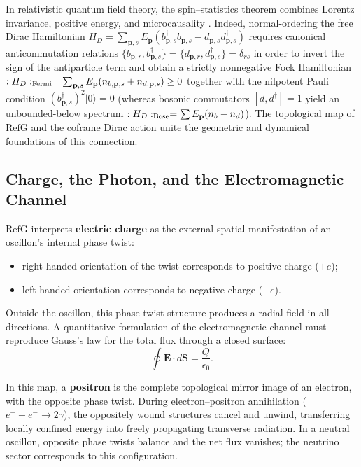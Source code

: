 \documentclass[11pt,a4paper]{article}
\newcommand{\RefG}{\mathrm{RefG}}
\begin{document}
In relativistic quantum field theory, the spin--statistics theorem combines Lorentz invariance, positive energy, and microcausality \citep{pauli1940}. Indeed, normal-ordering the free Dirac Hamiltonian $H_D = \sum_{\mathbf{p},s} E_{\mathbf{p}}\left(b_{\mathbf{p},s}^\dagger b_{\mathbf{p},s} - d_{\mathbf{p},s} d_{\mathbf{p},s}^\dagger\right)$ requires canonical anticommutation relations $\{b_{\mathbf{p},r}, b_{\mathbf{p},s}^\dagger\} = \{d_{\mathbf{p},r}, d_{\mathbf{p},s}^\dagger\} = \delta_{rs}$ in order to invert the sign of the antiparticle term and obtain a strictly nonnegative Fock Hamiltonian $:H_D:_{\rm Fermi} = \sum_{\mathbf{p},s} E_{\mathbf{p}}(n_{b,\mathbf{p},s} + n_{d,\mathbf{p},s}) \ge 0$ together with the nilpotent Pauli condition $(b_{\mathbf{p},s}^\dagger)^2|0\rangle = 0$ (whereas bosonic commutators $[d, d^\dagger] = 1$ yield an unbounded-below spectrum $:H_D:_{\rm Bose} = \sum E_{\mathbf{p}}(n_b - n_d)$). The topological map of $\RefG$ and the coframe Dirac action unite the geometric and dynamical foundations of this connection.

\subsection{Charge, the Photon, and the Electromagnetic Channel}

$\RefG$ interprets \textbf{electric charge} as the external spatial manifestation of an oscillon's internal phase twist:
\begin{itemize}
\item right-handed orientation of the twist corresponds to positive charge ($+e$);
\item left-handed orientation corresponds to negative charge ($-e$).
\end{itemize}

Outside the oscillon, this phase-twist structure produces a radial field in all directions. A quantitative formulation of the electromagnetic channel must reproduce Gauss's law for the total flux through a closed surface:
\begin{equation}
\oint \mathbf{E} \cdot d\mathbf{S} = \frac{Q}{\epsilon_0}.
\end{equation}

In this map, a \textbf{positron} is the complete topological mirror image of an electron, with the opposite phase twist. During electron--positron annihilation ($e^+ + e^- \to 2\gamma$), the oppositely wound structures cancel and unwind, transferring locally confined energy into freely propagating transverse radiation. In a neutral oscillon, opposite phase twists balance and the net flux vanishes; the neutrino sector corresponds to this configuration.
\end{document}
